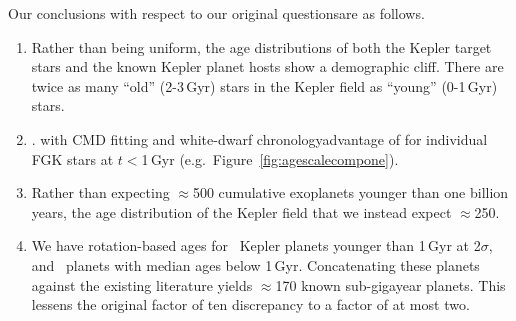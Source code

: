 \documentclass[11pt,twocolumn,tighten]{aastex63}
\begin{document}
Our conclusions with respect to our original questionsare as
follows.

\begin{enumerate}[leftmargin=*,topsep=0pt,itemsep=-0.5ex,partopsep=1ex,parsep=1ex]
  \item Rather than being uniform, the age distributions of both the
    Kepler target stars and the known Kepler planet hosts show a
    demographic cliff.  There are twice as many ``old'' (2-3\,Gyr)
    stars in the Kepler field as ``young'' (0-1\,Gyr) stars.  
\item {}.
       with  CMD fitting and white-dwarf
    chronologyadvantage of  for
    individual FGK stars at $t$$<$1\,Gyr (e.g.~Figure~\ref{fig:agescalecompone}).
  \item Rather than expecting $\approx$500 cumulative exoplanets younger than one
    billion years, the age distribution of the Kepler field
     that we  instead expect $\approx$250.
  \item We have  rotation-based ages for \nplyounggyrotwosigma\
    Kepler planets younger than 1\,Gyr at 2$\sigma$, and
    \nplyounggyro\ planets with median ages below 1\,Gyr.
    Concatenating these planets against the existing literature yields
    $\approx$170 known sub-gigayear planets.  This lessens the
    original factor of ten discrepancy to a factor of at most two.
\end{enumerate}
\end{document}
